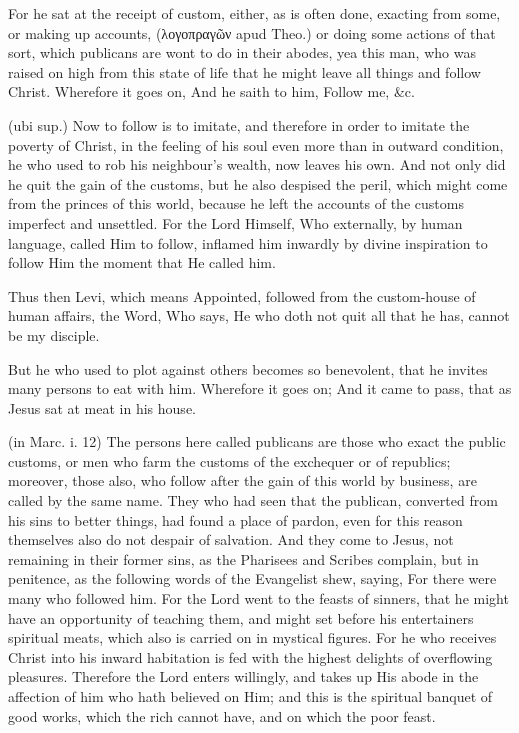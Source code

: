  For he sat at the receipt of custom, either, as is often done, exacting from some, or making up accounts, (\textgreek{λογοπραγῶν} apud Theo.) or doing some actions of that sort, which publicans are wont to do in their abodes, yea this man, who was raised on high from this state of life that he might leave all things and follow Christ. Wherefore it goes on, And he saith to him, Follow me, \&c.

 (ubi sup.) Now to follow is to imitate, and therefore in order to imitate the poverty of Christ, in the feeling of his soul even more than in outward condition, he who used to rob his neighbour’s wealth, now leaves his own. And not only did he quit the gain of the customs, but he also despised the peril, which might come from the princes of this world, because he left the accounts of the customs imperfect and unsettled. For the Lord Himself, Who externally, by human language, called Him to follow, inflamed him inwardly by divine inspiration to follow Him the moment that He called him.

 Thus then Levi, which means Appointed, followed from the custom-house of human affairs, the Word, Who says, He who doth not quit all that he has, cannot be my disciple.

 But he who used to plot against others becomes so benevolent, that he invites many persons to eat with him. Wherefore it goes on; And it came to pass, that as Jesus sat at meat in his house.

 (in Marc. i. 12) The persons here called publicans are those who exact the public customs, or men who farm the customs of the exchequer or of republics; moreover, those also, who follow after the gain of this world by business, are called by the same name. They who had seen that the publican, converted from his sins to better things, had found a place of pardon, even for this reason themselves also do not despair of salvation. And they come to Jesus, not remaining in their former sins, as the Pharisees and Scribes complain, but in penitence, as the following words of the Evangelist shew, saying, For there were many who followed him. For the Lord went to the feasts of sinners, that he might have an opportunity of teaching them, and might set before his entertainers spiritual meats, which also is carried on in mystical figures. For he who receives Christ into his inward habitation is fed with the highest delights of overflowing pleasures. Therefore the Lord enters willingly, and takes up His abode in the affection of him who hath believed on Him; and this is the spiritual banquet of good works, which the rich cannot have, and on which the poor feast.

